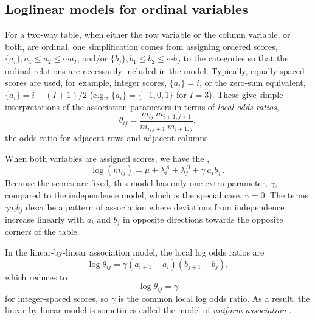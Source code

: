 \subsection{Loglinear models for ordinal variables}\label{sec:loglin-ordlog}
For a two-way table, when either the row variable or the column variable,
or both, are ordinal, one simplification comes from assigning ordered
scores, $\{a_i\}, a_1 \le a_2 \le \cdots a_I$, and/or
$\{b_j\}, b_1 \le b_2 \le \cdots b_J$
to the categories
so that the ordinal relations are necessarily included in the model.
Typically, equally spaced scores are used, for example, integer
scores, $\{a_i\}=i$, or the zero-sum equivalent, $\{a_i\}=i-(I+1)/2$
(e.g., $\{a_i\}= \{-1, 0, 1\}$ for $I=3$).
These give simple interpretations of the
association parameters in terms of \emph{local odds ratios},
\begin{equation*}
 \theta_{ij} =
 \frac{ m_{ij} \: m_{i+1, j+1} } { m_{i,j+1} \: m_{i+1, j} }
 \comma
\end{equation*}
the odds ratio for adjacent rows and adjacent columns.

When both variables are assigned scores, we have the ,
\begin{equation}\label{eq:linlin}
\log ( m_{ij} ) = \mu  +  \lambda_i^A
+  \lambda_j^B  +  \gamma \: a_i b_j \period
\end{equation}
Because the scores are fixed, this model has only one extra parameter, $\gamma$, compared to the
independence model, which is the special case, $\gamma=0$.
The terms  $\gamma a_i b_j $ describe a pattern of association
where deviations from independence increase linearly with $a_i$
and $b_j$ in opposite directions towards the opposite corners of
the table.

In the linear-by-linear association model, the local log odds ratios
are
\begin{equation*}
\log \theta_{ij} =
 \gamma (a_{i+1} - a_i) (b_{j+1} - b_j)
 \comma
\end{equation*}
which reduces to
\begin{equation*}
\log \theta_{ij} =
 \gamma
\end{equation*}
for integer-spaced scores, so $\gamma$ is the common local log odds ratio.
As a result, the linear-by-linear model is sometimes called the
model of \emph{uniform association} \citep{Goodman:79}.

